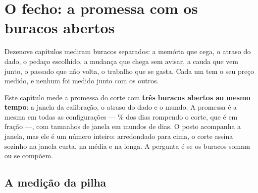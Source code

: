 \chapter{O fecho: a promessa com os buracos abertos}\label{cap:fecho}

Dezenove capítulos mediram buracos separados: a memória que cega, o atraso do dado, o pedaço
escolhido, a mudança que chega sem avisar, a cauda que vem junto, o passado que não volta, o trabalho
que se gasta. Cada um tem o seu preço medido, e nenhum foi medido junto com os outros.

Este capítulo mede a promessa do corte com \textbf{três buracos abertos ao mesmo tempo}: a
janela da calibração, o atraso do dado e o mundo. A promessa é a mesma em todas as
\numFechoConfiguracoes{} configurações --- \numPromessaPct{}\% dos dias rompendo o corte, que é
\numFechoPromessa{} em fração ---, com \numFechoJanelas{} tamanhos de
janela em mundos de \numFechoDias{} dias. O posto acompanha a janela, mas ele é um número inteiro:
arredondado para cima, o corte assina sozinho \numFechoAssinadoCurta{} na janela curta,
\numFechoAssinadoMedia{} na média e \numFechoAssinadoLonga{} na longa. A pergunta é se os buracos somam ou se compõem.

\section{A medição da pilha}

